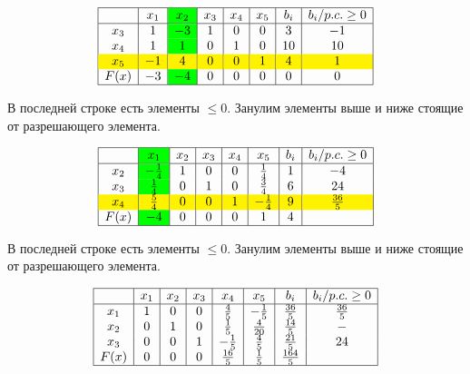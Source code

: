 \documentclass{article}
\begin{document}
\[
    \begin{array}{|c|c|>{\columncolor{green}}c|c|c|c|c|c|}
        \hline
             & x_1 & x_2 & x_3 & x_4 & x_5 & b_i & b_i/p.c. \geq 0 \\
        \hline
        x_3  & 1   & -3  & 1   & 0   & 0   & 3   & -1              \\
        x_4  & 1   & 1   & 0   & 1   & 0   & 10  & 10              \\
        \rowcolor{yellow}
        x_5  & -1  & 4   & 0   & 0   & 1   & 4   & 1               \\
        F(x) & -3  & -4  & 0   & 0   & 0   & 0   & 0               \\
        \hline
    \end{array}
\]

В последней строке есть элементы \(\leq 0\). Занулим элементы выше и ниже стоящие от разрешающего элемента.

\[
    \begin{array}{|c|>{\columncolor{green}}c|c|c|c|c|c|c|}
        \hline
             & x_1          & x_2 & x_3 & x_4 & x_5          & b_i & b_i/p.c. \geq 0 \\
        \hline
        x_2  & -\frac{1}{4} & 1   & 0   & 0   & \frac{1}{4}  & 1   & -4              \\
        x_3  & \frac{1}{4}  & 0   & 1   & 0   & \frac{3}{4}  & 6   & 24              \\
        \rowcolor{yellow}
        x_4  & \frac{5}{4}  & 0   & 0   & 1   & -\frac{1}{4} & 9   & \frac{36}{5}    \\
        F(x) & -4           & 0   & 0   & 0   & 1            & 4   &                 \\
        \hline
    \end{array}
\]

В последней строке есть элементы \(\leq 0\). Занулим элементы выше и ниже стоящие от разрешающего элемента.

\[
    \begin{array}{|c|c|c|c|c|c|c|c|}
        \hline
             & x_1 & x_2 & x_3 & x_4          & x_5          & b_i           & b_i/p.c. \geq 0 \\
        \hline
        x_1  & 1   & 0   & 0   & \frac{4}{5}  & -\frac{1}{5} & \frac{36}{5}  & \frac{36}{5}    \\
        x_2  & 0   & 1   & 0   & \frac{1}{5}  & \frac{4}{20} & \frac{14}{5}  & -               \\
        x_3  & 0   & 0   & 1   & -\frac{1}{5} & \frac{4}{5}  & \frac{21}{5}  & 24              \\
        F(x) & 0   & 0   & 0   & \frac{16}{5} & \frac{1}{5}  & \frac{164}{5} &                 \\
        \hline
    \end{array}
\]
\end{document}
